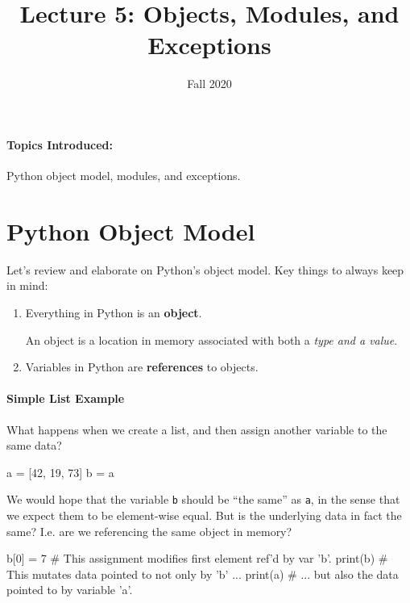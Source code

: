 \documentclass[12pt,letterpaper,twoside]{article}
\begin{document}
\title{Lecture 5: Objects, Modules, and Exceptions\vspace{-5ex}}
\date{Fall 2020}
\maketitle

{\footnotesize
\paragraph{Topics Introduced:} Python object model, 
modules, and exceptions.}
\vspace{-3ex}
\section{Python Object Model}
Let's review and elaborate on Python's object model. Key things to
always keep in mind:

\vspace{-2ex}
\begin{enumerate}
\item
  Everything in Python is an \textbf{object}.

  An object is a location in memory associated with both a \emph{type and a value}.
\item
  Variables in Python are \textbf{references} to objects.
\end{enumerate}

\vspace{-3ex}
\paragraph{Simple List Example} What happens when we create a list, 
and then assign another variable to the same data?

\begin{python}
a = [42, 19, 73]
b = a
\end{python}

We would hope that the variable \texttt{b} should be ``the same'' as \texttt{a}, 
in the sense that we expect them to be element-wise equal. But is the underlying
data in fact the same? I.e. are we referencing the same object in memory? 

\begin{python}
b[0] = 7   # This assignment modifies first element ref'd by var 'b'.
print(b)   # This mutates data pointed to not only by 'b' ...
print(a)   # ... but also the data pointed to by variable 'a'.
\end{python}
\end{document}
